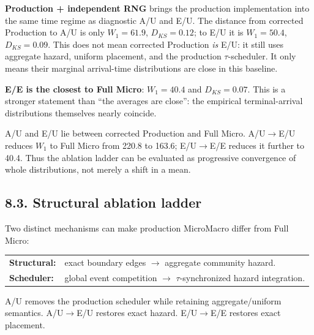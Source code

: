 \documentclass[11pt,a4paper]{article}
\begin{document}
\textbf{Production + independent RNG} brings the production implementation into the same time regime as diagnostic A/U and E/U. The distance from corrected Production to A/U is only $W_1=61.9$, $D_{KS}=0.12$; to E/U it is $W_1=50.4$, $D_{KS}=0.09$. This does not mean corrected Production \emph{is} E/U: it still uses aggregate hazard, uniform placement, and the production $\tau$-scheduler. It only means their marginal arrival-time distributions are close in this baseline.

\textbf{E/E is the closest to Full Micro}: $W_1=40.4$ and $D_{KS}=0.07$. This is a stronger statement than ``the averages are close'': the empirical terminal-arrival distributions themselves nearly coincide.

A/U and E/U lie between corrected Production and Full Micro. A/U$\to$E/U reduces $W_1$ to Full Micro from 220.8 to 163.6; E/U$\to$E/E reduces it further to 40.4. Thus the ablation ladder can be evaluated as progressive convergence of whole distributions, not merely a shift in a mean.

\subsection*{8.3. Structural ablation ladder}
Two distinct mechanisms can make production MicroMacro differ from Full Micro:
\begin{center}
\begin{tabular}{>{\raggedright\arraybackslash}p{30mm} >{\raggedright\arraybackslash}p{110mm}}
\textbf{Structural:} & exact boundary edges $\to$ aggregate community hazard.\\[2pt]
\textbf{Scheduler:} & global event competition $\to$ $\tau$-synchronized hazard integration.
\end{tabular}
\end{center}
A/U removes the production scheduler while retaining aggregate/uniform semantics. A/U$\to$E/U restores exact hazard. E/U$\to$E/E restores exact placement.
\end{document}
